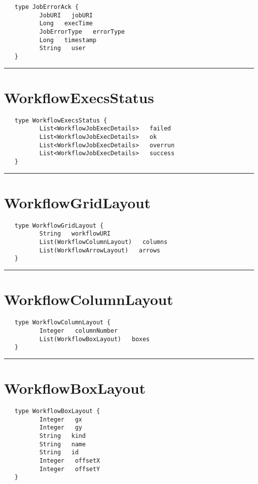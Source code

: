 \begin{verbatim}
   type JobErrorAck {
          JobURI   jobURI
          Long   execTime
          JobErrorType   errorType
          Long   timestamp
          String   user
   }
\end{verbatim}

\rule{15cm}{2pt}
\section{WorkflowExecsStatus}
\label{type:WorkflowExecsStatus}

\begin{verbatim}
   type WorkflowExecsStatus {
          List<WorkflowJobExecDetails>   failed
          List<WorkflowJobExecDetails>   ok
          List<WorkflowJobExecDetails>   overrun
          List<WorkflowJobExecDetails>   success
   }
\end{verbatim}

\rule{15cm}{2pt}
\section{WorkflowGridLayout}
\label{type:WorkflowGridLayout}

\begin{verbatim}
   type WorkflowGridLayout {
          String   workflowURI
          List(WorkflowColumnLayout)   columns
          List(WorkflowArrowLayout)   arrows
   }
\end{verbatim}

\rule{15cm}{2pt}
\section{WorkflowColumnLayout}
\label{type:WorkflowColumnLayout}

\begin{verbatim}
   type WorkflowColumnLayout {
          Integer   columnNumber
          List(WorkflowBoxLayout)   boxes
   }
\end{verbatim}

\rule{15cm}{2pt}
\section{WorkflowBoxLayout}
\label{type:WorkflowBoxLayout}

\begin{verbatim}
   type WorkflowBoxLayout {
          Integer   gx
          Integer   gy
          String   kind
          String   name
          String   id
          Integer   offsetX
          Integer   offsetY
   }
\end{verbatim}

